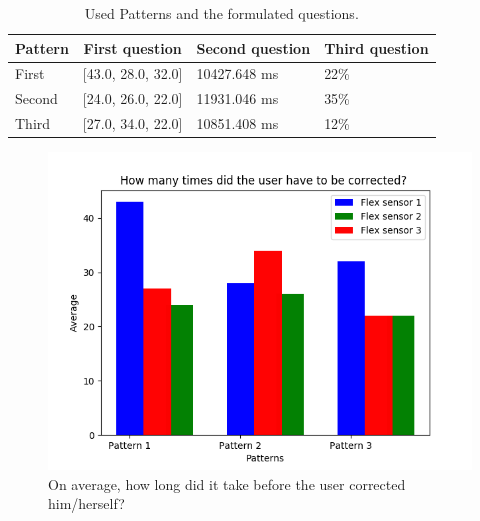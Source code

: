 \documentclass[sigconf]{acmart}
\begin{document}
\begin{table}[h]
\centering
\caption{Used Patterns and the formulated questions.}
\label{my-label}
\begin{tabular}{|l|l|l|l|}
\hline
Pattern & \multicolumn{1}{c|}{\textbf{First question}} & \multicolumn{1}{c|}{\textbf{Second question}} & \multicolumn{1}{c|}{\textbf{Third question}} \\ \hline
First   &  [43.0, 28.0, 32.0] 						  &				10427.648 ms		  			  &		22\%                          \\ \hline
Second  &  [24.0, 26.0, 22.0]              			  &  			11931.046 ms                      &     35\%                           \\ \hline
Third   &  [27.0, 34.0, 22.0]                         &       		10851.408 ms                      &     12\%                            \\ \hline
\end{tabular}
\end{table}

\begin{figure}[h]
\centering
\includegraphics[width=1\columnwidth, scale=1]{p_q1.png}
\caption{On average, how long did it take before the user corrected him/herself?}
\end{figure}
\end{document}
